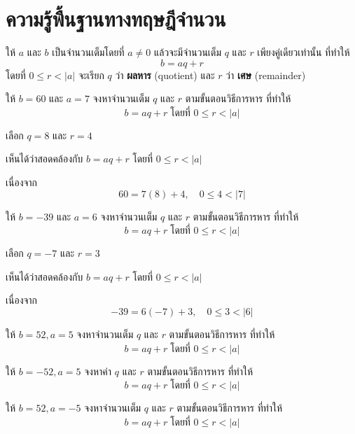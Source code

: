 \chapter{ความรู้พื้นฐานทางทฤษฎีจำนวน}
\begin{theorembox}
	ให้ $a$ และ $b$ เป็นจำนวนเต็มโดยที่ $a \neq 0$ แล้วจะมีจำนวนเต็ม $q$ และ $r$ เพียงคู่เดียวเท่านั้น ที่ทำให้ 
	\[b=a q+r\]
	โดยที่ $0 \leq r<|a|$ จะเรียก $q$ ว่า \textbf{ผลหาร} (quotient) และ $r$ ว่า \textbf{เศษ} (remainder)   
\end{theorembox}

\begin{examplebox}
	ให้ $b=60$ และ $a=7$ จงหาจำนวนเต็ม $q$ และ $r$ ตามขั้นตอนวิธีการหาร ที่ทำให้\\
	\[b=aq+r\;\text{โดยที่ $0 \leq r<|a|$}\]
\end{examplebox}
\solution เลือก $q=8$ และ $r=4$ 

เห็นได้ว่าสอดคล้องกับ $b=aq+r$ โดยที่ $0 \leq r<|a|$ 

เนื่องจาก
\[60=7(8)+4, \quad 0 \leq 4<|7|\]

\begin{examplebox}
	ให้ $b=-39$ และ $a=6$ จงหาจำนวนเต็ม $q$ และ $r$ ตามขั้นตอนวิธีการหาร ที่ทำให้\\
	\[b=aq+r\;\text{โดยที่ $0 \leq r<|a|$}\]
\end{examplebox}
\solution เลือก $q=-7$ และ $r=3$ 

เห็นได้ว่าสอดคล้องกับ $b=aq+r$ โดยที่ $0 \leq r<|a|$ 

เนื่องจาก
\[
-39=6(-7)+3, \quad 0 \leq 3<|6|
\]

\newpage
\begin{examplebox}
	ให้ $b=52, a=5$ จงหาจำนวนเต็ม $q$ และ $r$ ตามขั้นตอนวิธีการหาร ที่ทำให้\\
	\[b=aq+r\;\text{โดยที่ $0 \leq r<|a|$}\]  
\end{examplebox}
\solution
\vspace{3cm}  

\begin{examplebox}
	ให้ $b=-52, a=5$ จงหาค่า $q$ และ $r$ ตามขั้นตอนวิธีการหาร ที่ทำให้ \\
	\[b=aq+r\;\text{โดยที่ $0 \leq r<|a|$}\] 
\end{examplebox}
	\solution
\vspace{3cm}  

\begin{examplebox}
	ให้ $b=52, a=-5$ จงหาจำนวนเต็ม $q$ และ $r$ ตามขั้นตอนวิธีการหาร ที่ทำให้ \\
	\[b=aq+r\;\text{โดยที่ $0 \leq r<|a|$}\]
\end{examplebox}
	\solution 
\newpage 

